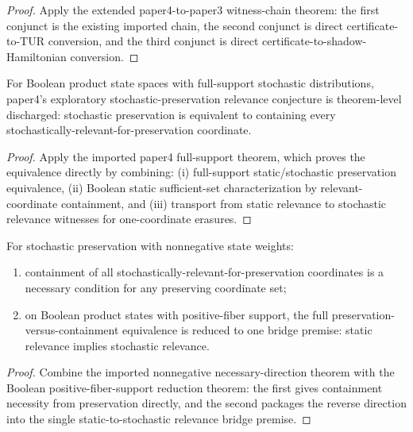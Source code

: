 \begin{proof}
Apply the extended paper4-to-paper3 witness-chain theorem: the first conjunct is the existing imported chain, the second conjunct is direct certificate-to-TUR conversion, and the third conjunct is direct certificate-to-shadow-Hamiltonian conversion.
\end{proof}

\begin{theorem}\label{thm:paper4-stochastic-relevance-conjecture-full-support}
For Boolean product state spaces with full-support stochastic distributions, paper4's exploratory stochastic-preservation relevance conjecture is theorem-level discharged: stochastic preservation is equivalent to containing every stochastically-relevant-for-preservation coordinate.
\end{theorem}

\begin{proof}
Apply the imported paper4 full-support theorem, which proves the equivalence directly by combining: (i) full-support static/stochastic preservation equivalence, (ii) Boolean static sufficient-set characterization by relevant-coordinate containment, and (iii) transport from static relevance to stochastic relevance witnesses for one-coordinate erasures.
\end{proof}

\begin{theorem}\label{thm:paper4-stochastic-relevance-general-distribution-progress}
For stochastic preservation with nonnegative state weights:
\begin{enumerate}
\item containment of all stochastically-relevant-for-preservation coordinates is a necessary condition for any preserving coordinate set;
\item on Boolean product states with positive-fiber support, the full preservation-versus-containment equivalence is reduced to one bridge premise: static relevance implies stochastic relevance.
\end{enumerate}
\end{theorem}

\begin{proof}
Combine the imported nonnegative necessary-direction theorem with the Boolean positive-fiber-support reduction theorem: the first gives containment necessity from preservation directly, and the second packages the reverse direction into the single static-to-stochastic relevance bridge premise.
\end{proof}

